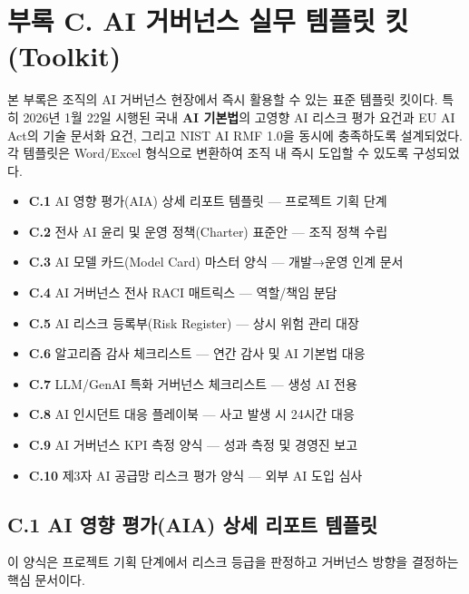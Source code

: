 \chapter*{부록 C. AI 거버넌스 실무 템플릿 킷(Toolkit)}
\label{ch:appendix_c}

본 부록은 조직의 AI 거버넌스 현장에서 즉시 활용할 수 있는 표준 템플릿 킷이다. 특히 2026년 1월 22일 시행된 국내 \textbf{AI 기본법}의 고영향 AI 리스크 평가 요건과 EU AI Act의 기술 문서화 요건, 그리고 NIST AI RMF 1.0을 동시에 충족하도록 설계되었다. 각 템플릿은 Word/Excel 형식으로 변환하여 조직 내 즉시 도입할 수 있도록 구성되었다.

\begin{tcolorbox}[colback=blue!5, colframe=blue!60, title=부록 C 구성 안내]
\begin{itemize}
    \item \textbf{C.1} AI 영향 평가(AIA) 상세 리포트 템플릿 — 프로젝트 기획 단계
    \item \textbf{C.2} 전사 AI 윤리 및 운영 정책(Charter) 표준안 — 조직 정책 수립
    \item \textbf{C.3} AI 모델 카드(Model Card) 마스터 양식 — 개발→운영 인계 문서
    \item \textbf{C.4} AI 거버넌스 전사 RACI 매트릭스 — 역할/책임 분담
    \item \textbf{C.5} AI 리스크 등록부(Risk Register) — 상시 위험 관리 대장
    \item \textbf{C.6} 알고리즘 감사 체크리스트 — 연간 감사 및 AI 기본법 대응
    \item \textbf{C.7} LLM/GenAI 특화 거버넌스 체크리스트 — 생성 AI 전용
    \item \textbf{C.8} AI 인시던트 대응 플레이북 — 사고 발생 시 24시간 대응
    \item \textbf{C.9} AI 거버넌스 KPI 측정 양식 — 성과 측정 및 경영진 보고
    \item \textbf{C.10} 제3자 AI 공급망 리스크 평가 양식 — 외부 AI 도입 심사
\end{itemize}
\end{tcolorbox}

\section*{C.1 AI 영향 평가(AIA) 상세 리포트 템플릿}

이 양식은 프로젝트 기획 단계에서 리스크 등급을 판정하고 거버넌스 방향을 결정하는 핵심 문서이다.

